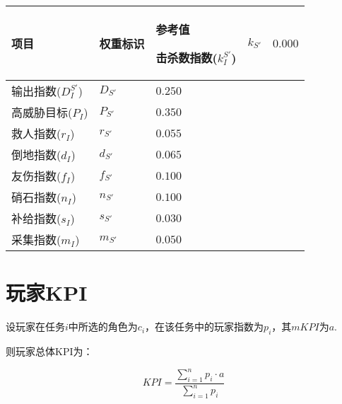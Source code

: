 \documentclass{ctexart}
\begin{document}
\begin{longtable}{|>{\centering\arraybackslash}p{8em}|>{\centering\arraybackslash}p{4em}|>{\centering\arraybackslash}p{6em}|}
    \hline

    项目                & 权重标识     & 参考值     \endhead

    \hline

    击杀数指数($k_I^{S'}$) & $k_{S'}$ & $0.000$          \\

    \hline

    输出指数($D_I^{S'}$)  & $D_{S'}$ & $0.250$          \\

    \hline

    高威胁目标($P_I$)      & $P_{S'}$ & $0.350$          \\

    \hline

    救人指数($r_I$)       & $r_{S'}$ & $0.055$          \\

    \hline

    倒地指数($d_I$)       & $d_{S'}$ & $0.065$          \\

    \hline

    友伤指数($f_I$)       & $f_{S'}$ & $0.100$          \\

    \hline

    硝石指数($n_I$)       & $n_{S'}$ & $0.100$          \\

    \hline

    补给指数($s_I$)       & $s_{S'}$ & $0.030$          \\

    \hline

    采集指数($m_I$)       & $m_{S'}$ & $0.050$          \\

    \hline
\end{longtable}

\section{玩家KPI}

设玩家在任务$i$中所选的角色为$c_i$，在该任务中的玩家指数为$p_i$，其$mKPI$为$a$.

则玩家总体KPI为：

\begin{equation}
    KPI = \frac{\sum_{i = 1}^{n} p_i \cdot a}{\sum_{i = 1}^{n} p_i}
\end{equation}
\end{document}
